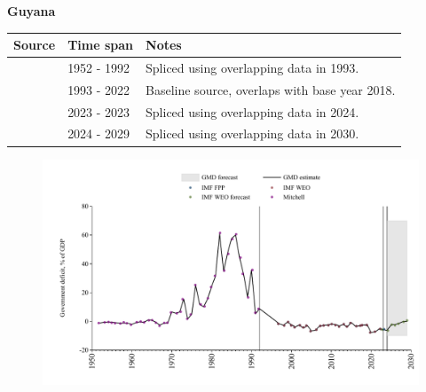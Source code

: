 \documentclass[12pt,a4paper,landscape]{article}
\begin{document}
\begin{adjustbox}{max totalsize={\paperwidth}{\paperheight},center}
\begin{minipage}[t][\textheight][t]{\textwidth}
\vspace*{0.5cm}
{}
\begin{center}
{\Large\bfseries Guyana}
\end{center}
\vspace{0.5cm}
\begin{table}[H]
\centering
\small
\begin{tabular}{|l|l|l|}
\hline
\textbf{Source} & \textbf{Time span} & \textbf{Notes} \\
\hline
\rowcolor{white}\cite{Mitchell}& 1952 - 1992 &Spliced using overlapping data in 1993.\\
\rowcolor{lightgray}\cite{IMF_WEO}& 1993 - 2022 &Baseline source, overlaps with base year 2018.\\
\rowcolor{white}\cite{IMF_FPP}& 2023 - 2023 &Spliced using overlapping data in 2024.\\
\rowcolor{lightgray}\cite{IMF_WEO_forecast}& 2024 - 2029 &Spliced using overlapping data in 2030.\\
\hline
\end{tabular}
\end{table}
\begin{figure}[H]
\centering
\includegraphics[width=\textwidth,height=0.6\textheight,keepaspectratio]{graphs/GUY_govdef_GDP.pdf}
\end{figure}
\end{minipage}
\end{adjustbox}
\end{document}
